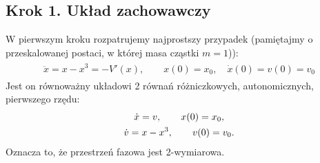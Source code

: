 \documentclass[a4paper,12pt,polish]{sphinxmanual}
\begin{document}
\subsection{Krok 1. Układ zachowawczy}
\label{ch2/chII011:krok-1-uklad-zachowawczy}
W pierwszym  kroku rozpatrujemy najprostszy przypadek (pamiętajmy o przeskalowanej postaci, w której masa cząstki $m=1$)):
\label{ch2/chII011:equation-eqn8}\begin{gather}
\begin{split}\ddot x = x - x^3 = - V'(x), \qquad x(0) = x_0, \quad  \dot x(0) = v(0) =  v_0\end{split}\label{ch2/chII011-eqn8}
\end{gather}
Jest on równoważny układowi 2 równań różniczkowych, autonomicznych, pierwszego rzędu:
\label{ch2/chII011:equation-eqn9}\begin{gather}
\begin{split}\dot x = v, \qquad x(0) = x_0,\end{split}\label{ch2/chII011-eqn9}\\\begin{split}\dot v = x - x^3, \qquad v(0) = v_0.\end{split}\notag
\end{gather}
Oznacza to, że przestrzeń fazowa jest 2-wymiarowa.
\end{document}
